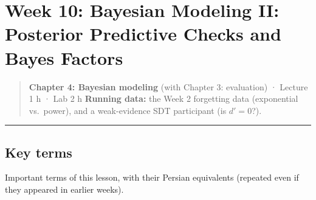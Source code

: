 \section{Week 10: Bayesian Modeling II: Posterior Predictive Checks and
Bayes Factors}

\begin{quote}
\textbf{Chapter 4: Bayesian modeling} (with Chapter 3: evaluation) ·
Lecture 1 h · Lab 2 h \textbf{Running data:} the Week 2 forgetting data
(exponential vs.~power), and a weak-evidence SDT participant (is
\(d' = 0\)?).
\end{quote}

\begin{center}\rule{0.5\linewidth}{0.5pt}\end{center}

\subsection{Key terms}

Important terms of this lesson, with their Persian equivalents (repeated
even if they appeared in earlier weeks).

